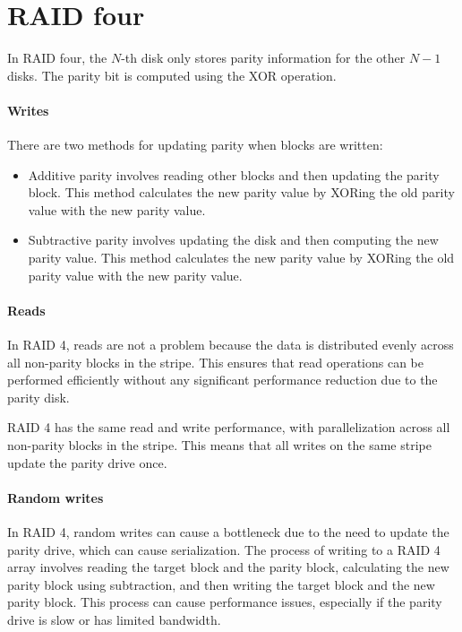\section{RAID four}

In RAID four, the $N$-th disk only stores parity information for the other $N-1$ disks. 
The parity bit is computed using the XOR operation.

\paragraph*{Writes}
There are two methods for updating parity when blocks are written:
\begin{itemize}
    \item Additive parity involves reading other blocks and then updating the parity block. 
        This method calculates the new parity value by XORing the old parity value with the new parity value.
    \item Subtractive parity involves updating the disk and then computing the new parity value. 
        This method calculates the new parity value by XORing the old parity value with the new parity value.
\end{itemize}

\paragraph*{Reads}
In RAID 4, reads are not a problem because the data is distributed evenly across all non-parity blocks in the stripe. 
This ensures that read operations can be performed efficiently without any significant performance reduction due to the parity disk.

RAID 4 has the same read and write performance, with parallelization across all non-parity blocks in the stripe. 
This means that all writes on the same stripe update the parity drive once.

\paragraph*{Random writes}
In RAID 4, random writes can cause a bottleneck due to the need to update the parity drive, which can cause serialization. 
The process of writing to a RAID 4 array involves reading the target block and the parity block, calculating the new parity block using subtraction, and then writing the target block and the new parity block. 
This process can cause performance issues, especially if the parity drive is slow or has limited bandwidth.

